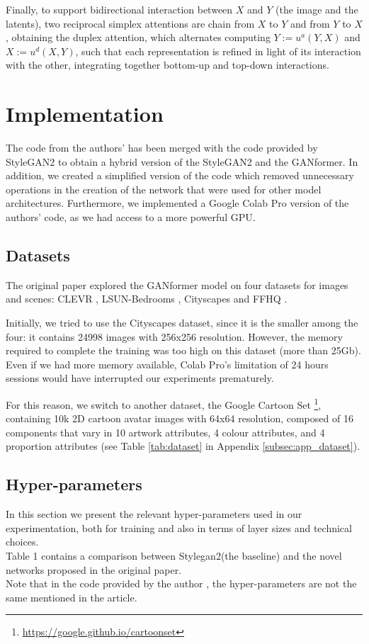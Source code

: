 \documentclass{article}
\begin{document}
	Finally, to support bidirectional interaction between $X$ and $Y$ (the image and the latents), two 
	reciprocal simplex attentions are chain from $X$ to $Y$ and from $Y$ to $X$, obtaining the duplex 
	attention, which alternates computing $Y :=u^a(Y,X)$ and $X:=u^d(X,Y)$, such that each 
	representation is refined in light of its interaction with the other, integrating together bottom-up and 
	top-down interactions.
	
	\section{Implementation}
	
	The code from the authors' has been merged with the code provided by StyleGAN2 to obtain a 
	hybrid version of the
	StyleGAN2 and the GANformer. In addition, we created a simplified version of the code which 
	removed unnecessary
	operations in the creation of the network that were used for other model architectures. Furthermore, 
	we implemented a Google Colab Pro version of
	the authors’ code, as we had access to a more powerful GPU.
	
	\subsection{Datasets}	\label{sec:dataset}
	The original paper \cite{hudson2021generative} explored the GANformer model on four datasets for 
	images and scenes: CLEVR \cite{johnson2017clevr}, LSUN-Bedrooms \cite{yu2015lsun}, Cityscapes 
	\cite{cordts2016cityscapes} and FFHQ \cite{karras2019style}. 
	
	Initially, we tried to use the Cityscapes dataset, since it is the smaller among the four: it contains 
	24998 images with 256x256 resolution. 
	However, the memory required to complete the training was too high on this dataset (more than 
	25Gb).
	Even if we had more memory available, Colab Pro's limitation of 24 hours sessions would have 
	interrupted our experiments prematurely.
	
	For this reason, we switch to another dataset, the Google Cartoon Set \cite{cartoonset}\footnote{	
		\url{https://google.github.io/cartoonset}}, containing 10k 2D cartoon avatar 
	images with 64x64 resolution, composed of 16 components that vary in 10 artwork attributes, 4 
	colour attributes, and 4 proportion attributes (see Table \ref{tab:dataset} in Appendix 
	\ref{subsec:app_dataset}). 
	
	\subsection{Hyper-parameters}\label{sec:hyperparam}
	In this section we present the relevant hyper-parameters used in our experimentation, both for 
	training and also in terms of layer sizes and technical choices.\\
	Table 1 contains a comparison between Stylegan2(the baseline) and the novel networks proposed in 
	the original paper.\\
	Note that in the code provided by the author \cite{hudson2021generative}, the 
	hyper-parameters are not the same mentioned in the article.
	
\end{document}
